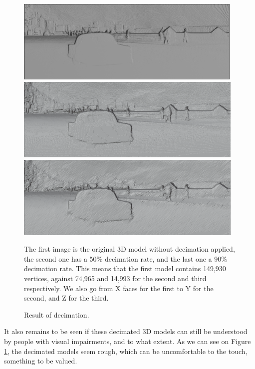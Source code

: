 \documentclass[12pt, letterpaper]{article}
\begin{document}
\begin{spacing}{1.15}
\begin{figure}[!ht]
    \begin{center}
        \includegraphics[height = 4cm]{test_image_pred_colored3d}
        \includegraphics[height = 4cm]{test_image_pred_colored_3d_50}
        \includegraphics[height = 4cm]{test_image_pred_colored_3d_90}


        \caption{Result of decimation.}
        \label{decimation}
    \end{center}
    \small
    The first image is the original 3D model without decimation applied, the second one has a 50\% decimation rate, and the last one a 90\%
    decimation rate. This means that the first model contains 149,930 vertices, against 74,965 and 14,993 for the second and third respectively.
    We also go from X faces for the first to Y for the second, and Z for the third.
\end{figure}

It also remains to be seen if these decimated 3D models can still be understood by people with visual impairments, and to what extent. As we can see on Figure 
\ref{decimation}, the decimated models seem rough, which can be uncomfortable to the touch, something to be valued.


\clearpage
\newpage



\end{spacing}
\end{document}

